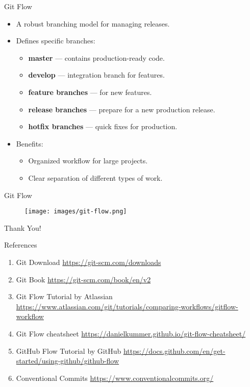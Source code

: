 \documentclass{beamer}
\begin{document}
\begin{frame}{Git Flow}
  \begin{itemize}
      \item A robust branching model for managing releases.
      \item Defines specific branches:
      \begin{itemize}
          \item \textbf{master} --- contains production-ready code.
          \item \textbf{develop} --- integration branch for features.
          \item \textbf{feature branches} --- for new features.
          \item \textbf{release branches} --- prepare for a new production release.
          \item \textbf{hotfix branches} --- quick fixes for production.
      \end{itemize}
      \item Benefits:
      \begin{itemize}
          \item Organized workflow for large projects.
          \item Clear separation of different types of work.
      \end{itemize}
  \end{itemize}
\end{frame}

\begin{frame}{Git Flow}
  \begin{figure}[h]
    \centering
    \texttt{[image: images/git-flow.png]}
  \end{figure}
\end{frame}

\begin{frame}
    \centering
    \Huge{Thank You!}
\end{frame}

\begin{frame}{References}
  \begin{enumerate}
    \item Git Download \href{https://git-scm.com/downloads}{https://git-scm.com/downloads}
    \item Git Book \href{https://git-scm.com/book/en/v2}{https://git-scm.com/book/en/v2}
    \item Git Flow Tutorial by Atlassian \href{https://www.atlassian.com/git/tutorials/comparing-workflows/gitflow-workflow}{https://www.atlassian.com/git/tutorials/comparing-workflows/gitflow-workflow}
    \item Git Flow cheatsheet \href{https://danielkummer.github.io/git-flow-cheatsheet/}{https://danielkummer.github.io/git-flow-cheatsheet/}
    \item GitHub Flow Tutorial by GitHub \href{https://docs.github.com/en/get-started/using-github/github-flow}{https://docs.github.com/en/get-started/using-github/github-flow}
    \item Conventional Commits \href{https://www.conventionalcommits.org/}{https://www.conventionalcommits.org/}
  \end{enumerate}
\end{frame}
\end{document}

